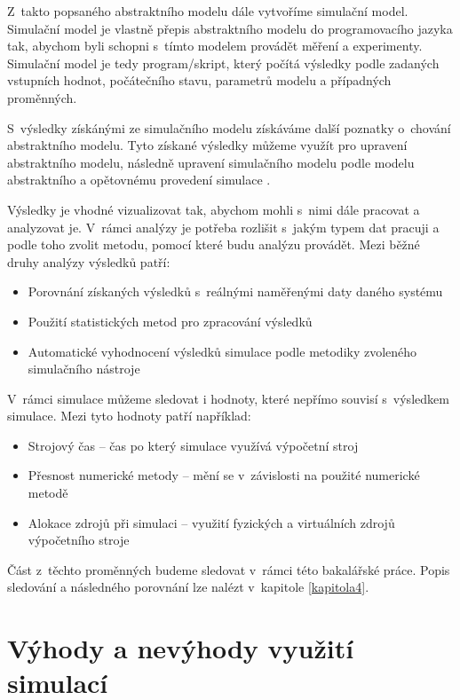 Z~takto popsaného abstraktního modelu dále vytvoříme simulační model. Simulační model je vlastně přepis abstraktního modelu do programovacího jazyka tak, abychom byli schopni s~tímto modelem provádět měření a experimenty. Simulační model je tedy program/skript, který počítá výsledky podle zadaných vstupních hodnot, počátečního stavu, parametrů modelu a případných proměnných.

S~výsledky získánými ze simulačního modelu získáváme další poznatky o~chování abstraktního modelu. Tyto získané výsledky můžeme využít pro upravení abstraktního modelu, následně upravení simulačního modelu podle modelu abstraktního a opětovnému provedení simulace \cite{IMS-skripta}.

Výsledky je vhodné vizualizovat tak, abychom mohli s~nimi dále pracovat a analyzovat je. V~rámci analýzy je potřeba rozlišit s~jakým typem dat pracuji a podle toho zvolit metodu, pomocí které budu analýzu provádět. Mezi běžné druhy analýzy výsledků patří:
\begin{itemize}
    \item Porovnání získaných výsledků s~reálnými naměřenými daty daného systému
    \item Použití statistických metod pro zpracování výsledků
    \item Automatické vyhodnocení výsledků simulace podle metodiky zvoleného simulačního nástroje
\end{itemize}

V~rámci simulace můžeme sledovat i hodnoty, které nepřímo souvisí s~výsledkem simulace. Mezi tyto hodnoty patří například:
\begin{itemize}
    \item Strojový čas -- čas po který simulace využívá výpočetní stroj
    \item Přesnost numerické metody -- mění se v~závislosti na použité numerické metodě
    \item Alokace zdrojů při simulaci -- využití fyzických a virtuálních zdrojů výpočetního stroje
\end{itemize}

Část z~těchto proměnných budeme sledovat v~rámci této bakalářské práce. Popis sledování a následného porovnání lze nalézt v~kapitole \ref{kapitola4}.

\section{Výhody a nevýhody využití simulací}

